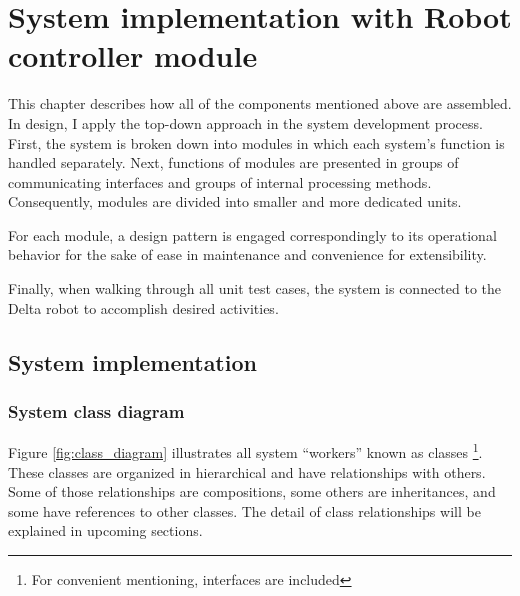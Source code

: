 \chapter{System implementation with Robot controller module}
\indent This chapter describes how all of the components mentioned above are assembled. In design, I apply the top-down approach in the system development process. First, the system is broken down into modules in which each system's function is handled separately. Next, functions of modules are presented in groups of communicating interfaces and groups of internal processing methods. Consequently, modules are divided into smaller and more dedicated units.

For each module, a design pattern is engaged correspondingly to its operational behavior for the sake of ease in maintenance and convenience for extensibility.

Finally, when walking through all unit test cases, the system is connected to the Delta robot to accomplish desired activities.

\section{System implementation}
\subsection{System class diagram}
Figure \ref{fig:class_diagram} illustrates all system ``workers'' known as classes \footnote{For convenient mentioning, interfaces are included}. These classes are organized in hierarchical and have relationships with others. Some of those relationships are compositions, some others are inheritances, and some have references to other classes. The detail of class relationships will be explained in upcoming sections.

